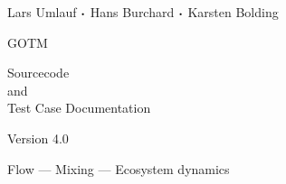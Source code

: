 \documentclass[a4paper,twoside,11pt]{article}
\begin{document}
\begin{titlepage}


{\sf \bf \LARGE
 \begin{center}
   Lars Umlauf ${\boldsymbol \cdot}$ Hans Burchard ${\boldsymbol \cdot}$ Karsten Bolding
 \end{center}
}

\vspace{14mm}

{\sf \bf \Huge
 \begin{center}
   GOTM
 \end{center}
}

\vspace{6mm}

{\sf \bf \LARGE
 \begin{center}
   Sourcecode \\
      and \\
Test Case Documentation
 \end{center}
}


\vspace{5mm}

{\sf \bf \Large
 \begin{center}
  Version 4.0
 \end{center}
}

\vspace{8mm}

\begin{figure}[!h]
  \begin{center}
  \end{center}
\end{figure}

\vspace{7mm}

{\sf \bf \Large
 \begin{center}
  Flow ---  Mixing --- Ecosystem dynamics
\end{center}
}


\end{titlepage}

\cleardoublepage
\tableofcontents


\cleardoublepage



\cleardoublepage



\cleardoublepage


\end{document}

